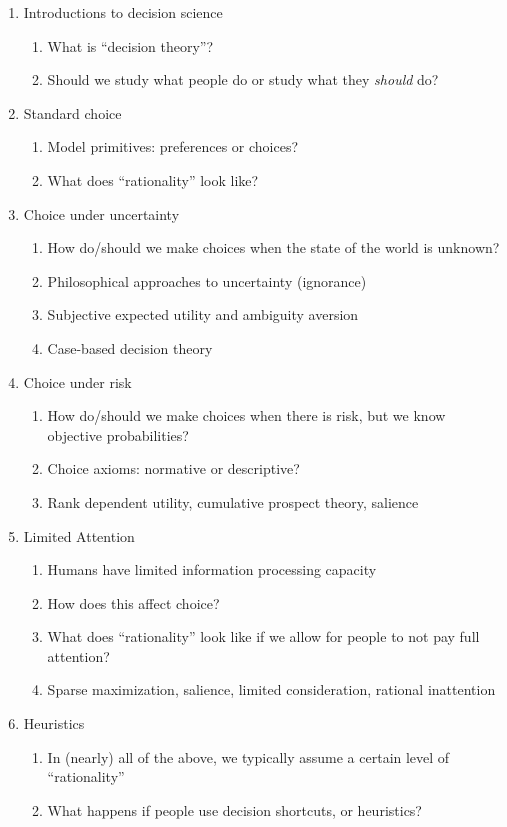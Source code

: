 \documentclass[letterpaper, 12pt, titlepage]{article}
\begin{document}
\begin{enumerate}
\item Introductions to decision science
  \begin{enumerate}
  \item What is ``decision theory''?
  \item Should we study what people do or study what they \emph{should} do?
  \end{enumerate}
  
\item Standard choice
  \begin{enumerate}
  \item Model primitives: preferences or choices?
  \item What does ``rationality'' look like?
  \end{enumerate}
  
\item Choice under uncertainty
  \begin{enumerate}
  \item How do/should we make choices when the state of the world is unknown?
  \item Philosophical approaches to uncertainty (ignorance)
  \item Subjective expected utility and ambiguity aversion
  \item Case-based decision theory
  \end{enumerate}
  
\item Choice under risk
  \begin{enumerate}
  \item How do/should we make choices when there is risk, but we know objective
    probabilities?
  \item Choice axioms: normative or descriptive?
  \item Rank dependent utility, cumulative prospect theory, salience
  \end{enumerate}

\item Limited Attention
  \begin{enumerate}
  \item Humans have limited information processing capacity
  \item How does this affect choice?
  \item What does ``rationality'' look like if we allow for people to not pay
    full attention?
  \item Sparse maximization, salience, limited consideration, rational inattention
  \end{enumerate}

\item Heuristics
  \begin{enumerate}
  \item In (nearly) all of the above, we typically assume a certain level of
    ``rationality''
  \item What happens if people use decision shortcuts, or heuristics?
  \end{enumerate}
\end{enumerate}
\end{document}
